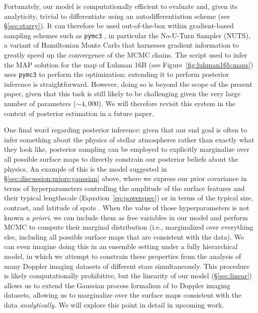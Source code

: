 \documentclass[modern]{aastex631}
\begin{document}
Fortunately, our model is computationally efficient to evaluate and, given its analyticity, trivial to differentiate using an autodifferentiation scheme (see \S\ref{sec:starry}).
It can therefore be used out-of-the-box within gradient-based sampling schemes such as \texttt{pymc3} \citep{Salvatier2016}, in particular the No-U-Turn Sampler (NUTS), a variant of Hamiltonian Monte Carlo that harnesses gradient information to greatly speed up the convergence of the MCMC chains. 
The script used to infer the MAP solution for the map of Luhman 16B (see Figure~\ref{fig:luhman16b:maps}) uses \texttt{pymc3} to perform the optimization; extending it to perform posterior inference is straightforward.
However, doing so is beyond the scope of the present paper, given that this task is still likely to be challenging given the very large number of parameters (${\sim}4{,}000$). 
We will therefore revisit this system in the context of posterior estimation in a future paper.

One final word regarding posterior inference: given that our end goal is often to infer something about the physics of stellar atmospheres rather than exactly what they look like, posterior sampling can be employed to explicitly marginalize over all possible surface maps to directly constrain our posterior beliefs about the physics.
An example of this is the model suggested in \S\ref{sec:discussion:priors:gaussian} above, where we express our prior covariance in terms of hyperparameters controlling the amplitude of the surface features and their typical lengthscale (Equation~\ref{eq:powerspec}) or in terms of the typical size, contrast, and latitude of spots \citep{Luger2021b,Luger2021d}.
When the value of those hyperparameters is not known \emph{a priori}, we can include them as free variables in our model and perform MCMC to compute their marginal distribution (i.e., marginalized over everything else, including all possible surface maps that are consistent with the data).
We can even imagine doing this in an ensemble setting under a fully hierarchical model, in which we attempt to constrain these properties from the analysis of many Doppler imaging datasets of different stars simultaneously.
This procedure is likely computationally prohibitive, but the linearity of our model (\S\ref{sec:linear}) allows us to extend the Gaussian process formalism of \citet{Luger2021b} to Doppler imaging datasets, allowing us to marginalize over the surface maps consistent with the data \emph{analytically}.
We will explore this point in detail in upcoming work.
\end{document}
